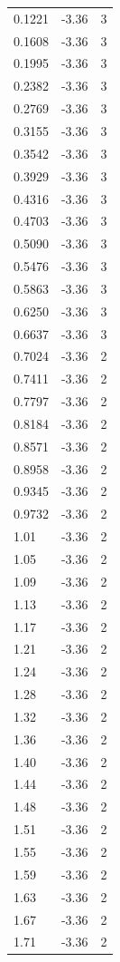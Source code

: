 \begin{longtable}{lrr}
  0.1221 & -3.36 & 3 \\
  0.1608 & -3.36 & 3 \\
  0.1995 & -3.36 & 3 \\
  0.2382 & -3.36 & 3 \\
  0.2769 & -3.36 & 3 \\
  0.3155 & -3.36 & 3 \\
  0.3542 & -3.36 & 3 \\
  0.3929 & -3.36 & 3 \\
  0.4316 & -3.36 & 3 \\
  0.4703 & -3.36 & 3 \\
  0.5090 & -3.36 & 3 \\
  0.5476 & -3.36 & 3 \\
  0.5863 & -3.36 & 3 \\
  0.6250 & -3.36 & 3 \\
  0.6637 & -3.36 & 3 \\
  0.7024 & -3.36 & 2 \\
  0.7411 & -3.36 & 2 \\
  0.7797 & -3.36 & 2 \\
  0.8184 & -3.36 & 2 \\
  0.8571 & -3.36 & 2 \\
  0.8958 & -3.36 & 2 \\
  0.9345 & -3.36 & 2 \\
  0.9732 & -3.36 & 2 \\
  1.01 & -3.36 & 2 \\
  1.05 & -3.36 & 2 \\
  1.09 & -3.36 & 2 \\
  1.13 & -3.36 & 2 \\
  1.17 & -3.36 & 2 \\
  1.21 & -3.36 & 2 \\
  1.24 & -3.36 & 2 \\
  1.28 & -3.36 & 2 \\
  1.32 & -3.36 & 2 \\
  1.36 & -3.36 & 2 \\
  1.40 & -3.36 & 2 \\
  1.44 & -3.36 & 2 \\
  1.48 & -3.36 & 2 \\
  1.51 & -3.36 & 2 \\
  1.55 & -3.36 & 2 \\
  1.59 & -3.36 & 2 \\
  1.63 & -3.36 & 2 \\
  1.67 & -3.36 & 2 \\
  1.71 & -3.36 & 2 \\

\end{longtable}

